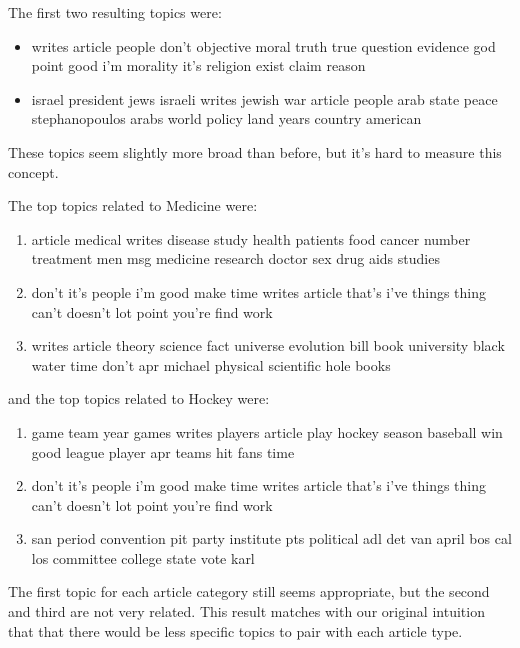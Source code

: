 The first two resulting topics were:
\begin{itemize}
	\item writes article people don't objective moral truth true question evidence god point good i'm morality it's religion exist claim reason
	\item israel president jews israeli writes jewish war article people arab state peace stephanopoulos arabs world policy land years country american
\end{itemize}
These topics seem slightly more broad than before, but it's hard to measure this concept.

The top topics related to Medicine were:
\begin{enumerate}
	\item article medical writes disease study health patients food cancer number treatment men msg medicine research doctor sex drug aids studies
	\item don't it's people i'm good make time writes article that's i've things thing can't doesn't lot point you're find work
	\item writes article theory science fact universe evolution bill book university black water time don't apr michael physical scientific hole books
\end{enumerate}
and the top topics related to Hockey were:
\begin{enumerate}
	\item game team year games writes players article play hockey season baseball win good league player apr teams hit fans time
	\item don't it's people i'm good make time writes article that's i've things thing can't doesn't lot point you're find work
	\item san period convention pit party institute pts political adl det van april bos cal los committee college state vote karl 
\end{enumerate}
The first topic for each article category still seems appropriate, but the second and third are not very related.
This result matches with our original intuition that that there would be less specific topics to pair with each article type.